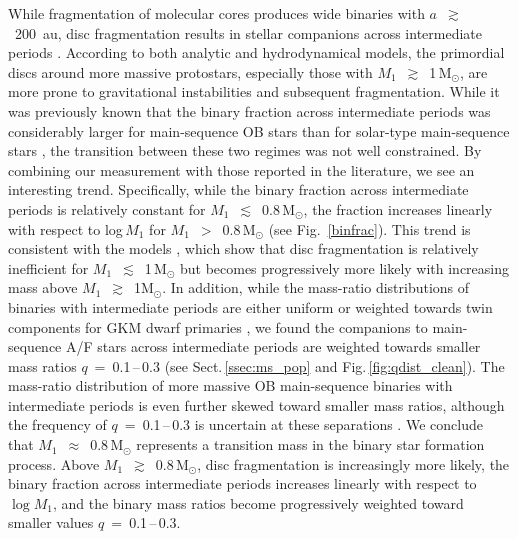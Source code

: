 \documentclass[a4paper,fleqn,usenatbib]{mnras}
\begin{document}
While fragmentation of molecular cores produces wide binaries with $a$~$\gtrsim$~200~au, disc fragmentation results in stellar companions across intermediate periods \citep{tohline2002,kratter2011,tobinetal2016,moe&distefano2017,guszejnovetal2017}.  According to both analytic \citep{kratter&matzner2006} and hydrodynamical \citep{kratteretal2010a} models, the primordial discs around more massive protostars, especially those with $M_1$~$\gtrsim$~1\,M$_{\odot}$, are more prone to gravitational instabilities and subsequent fragmentation.  While it was previously known that the binary fraction across intermediate periods was considerably larger for main-sequence OB stars than for solar-type main-sequence stars \citep{abtetal1990,sanaetal2013,moe&distefano2017}, the transition between these two regimes was not well constrained.  By combining our measurement with those reported in the literature, we see an interesting trend.  Specifically, while the binary fraction across intermediate periods is relatively constant for $M_1$~$\lesssim$~0.8\,M$_{\odot}$, the fraction increases linearly with respect to log\,$M_1$ for $M_1$~$>$~0.8\,M$_{\odot}$ (see Fig.~\ref{binfrac}).  This trend is consistent with the models \citep{kratter&matzner2006,kratteretal2010a}, which show that disc fragmentation is relatively inefficient for $M_1$~$\lesssim$~1\,M$_{\odot}$ but becomes progressively more likely with increasing mass above $M_1$~$\gtrsim$~1M$_{\odot}$.  In addition, while the mass-ratio distributions of binaries with intermediate periods are either uniform or weighted towards twin components for GKM dwarf primaries \citep{duquennoy&mayor1991,fischer&marcy1992,raghavanetal2010}, we found the companions to main-sequence A/F stars across intermediate periods are weighted towards smaller mass ratios $q$~=~0.1\,--\,0.3 (see Sect.\,\ref{ssec:ms_pop} and Fig.\,\ref{fig:qdist_clean}).  The mass-ratio distribution of more massive OB main-sequence binaries with intermediate periods is even further skewed toward smaller mass ratios, although the frequency of $q$~=~0.1\,--\,0.3 is uncertain at these separations \citep{abtetal1990,moe&distefano2017}.  We conclude that $M_1$~$\approx$~0.8\,M$_{\odot}$ represents a transition mass in the binary star formation process.  Above $M_1$~$\gtrsim$~0.8\,M$_{\odot}$, disc fragmentation is increasingly more likely,  the binary fraction across intermediate periods increases linearly with respect to $\log M_1$, and the binary mass ratios become progressively weighted toward smaller values $q$~=~0.1\,--\,0.3.
\end{document}
